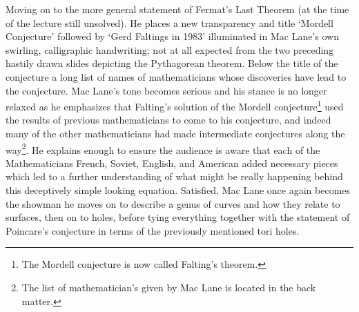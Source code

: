 Moving on to the more general statement of Fermat's Last Theorem (at the time of the lecture still unsolved). He places a new transparency and title `Mordell Conjecture' followed by `Gerd Faltings in 1983' illuminated in Mac Lane's own swirling, calligraphic handwriting; not at all expected from the two preceding hastily drawn slides depicting the Pythagorean theorem. Below the title of the conjecture a long list of names of mathematicians whose discoveries have lead to the conjecture. Mac Lane's tone becomes  serious and his stance is no longer relaxed as he emphasizes that Falting's solution of the Mordell conjecture\footnote{The Mordell conjecture is now called Falting's theorem.} used the results of previous mathematicians to come to his conjecture, and indeed many of the other mathematicians had made intermediate conjectures along the way\footnote{The list of mathematician's given by Mac Lane is located in the back matter.}. He explains enough to ensure the audience is aware that each of the Mathematicians French, Soviet, English, and American added necessary pieces which led to a further understanding of what might be really happening behind this deceptively simple looking equation. Satisfied, Mac Lane once again becomes the showman he moves on to describe a genus of curves and how they relate to surfaces, then on to holes, before tying everything together with the statement of Poincare's conjecture in terms of the previously mentioned tori holes.